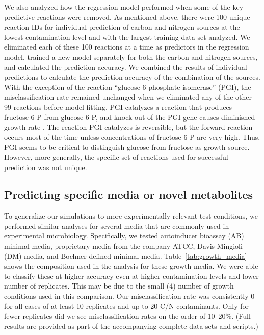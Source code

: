 \documentclass[12pt]{article}
\begin{document}
We also analyzed how the regression model performed when some of the key predictive reactions were removed. As mentioned above, there were 100 unique reaction IDs for individual prediction of carbon and nitrogen sources at the lowest contamination level and with the largest training data set analyzed. We eliminated each of these 100 reactions at a time as predictors in the regression model, trained a new model separately for both the carbon and nitrogen sources, and calculated the prediction accuracy. We combined the results of individual predictions to calculate the prediction accuracy of the combination of the sources. With the exception of the reaction ``glucose 6-phosphate isomerase'' (PGI), the misclassification rate remained unchanged when we eliminated any of the other 99 reactions before model fitting. PGI catalyzes a reaction that produces fructose-6-P from glucose-6-P, and knock-out of the PGI gene causes diminished growth rate \cite{Canonacoetal2001}. The reaction PGI catalyzes is reversible, but the forward reaction occurs most of the time unless concentrations of fructose-6-P are very high. Thus, PGI seems to be critical to distinguish glucose from fructose as growth source. However, more generally, the specific set of reactions used for successful prediction was not unique.


\subsection*{Predicting specific media or novel metabolites}

To generalize our simulations to more experimentally relevant test conditions, we performed similar analyses for several media that are commonly used in experimental microbiology. Specifically, we tested autoinducer bioassay (AB) minimal media, proprietary media from the company ATCC, Davis Mingioli (DM) media, and Bochner defined minimal media. Table~\ref{tab:growth_media} shows the composition used in the analysis for these growth media. We were able to classify these at higher accuracy even at higher contamination levels and lower number of replicates. This may be due to the small (4) number of growth conditions used in this comparison. Our misclassification rate was consistently 0 for all cases of at least 10 replicates and up to 20 C/N contaminants. Only for fewer replicates did we see misclassification rates on the order of 10--20\%. (Full results are provided as part of the accompanying complete data sets and scripts.)
\end{document}
